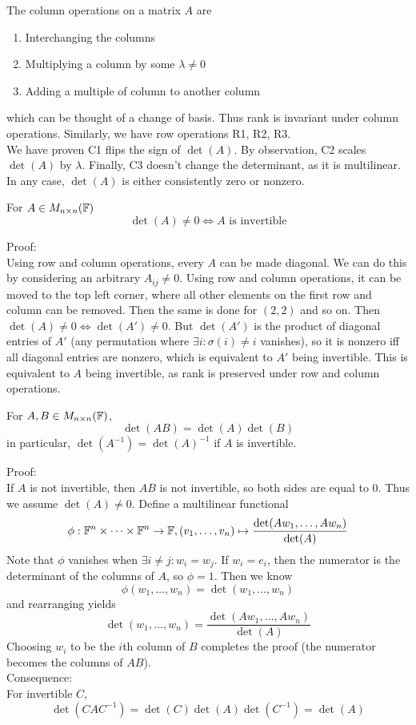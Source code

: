 \documentclass[12pt]{article}
\begin{document}
The column operations on a matrix $A$ are

\begin{enumerate}
	\item Interchanging the columns \\
	\item Multiplying a column by some $\lambda\neq0$ \\
	\item Adding a multiple of column to another column
\end{enumerate}

which can be thought of a change of basis. Thus rank is invariant under column operations. Similarly, we have row operations R1, R2, R3. \\
We have proven C1 flips the sign of $\det(A)$. By observation, C2 scales $\det(A)$ by $\lambda$. Finally, C3 doesn't change the determinant, as it is multilinear. In any case, $\det(A)$ is either consistently zero or nonzero.

\begin{thm}
	For $A\in M_{n\times n}(\mathbb{F})$
	$$\det(A)\neq0 \Leftrightarrow A \text{ is invertible}$$
\end{thm}

Proof: \\
Using row and column operations, every $A$ can be made diagonal. We can do this by considering an arbitrary $A_{ij}\neq0$. Using row and column operations, it can be moved to the top left corner, where all other elements on the first row and column can be removed. Then the same is done for $(2,2)$ and so on. Then $\det(A)\neq0\Leftrightarrow\det(A')\neq0$. But $\det(A')$ is the product of diagonal entries of $A'$ (any permutation where $\exists i:\sigma(i)\neq i$ vanishes), so it is nonzero iff all diagonal entries are nonzero, which is equivalent to $A'$ being invertible. This is equivalent to $A$ being invertible, as rank is preserved under row and column operations.

\begin{thm}
	For $A,B\in M_{n\times n}(\mathbb{F})$,
	$$\det(AB) = \det(A)\det(B)$$
	in particular, $\det(A^{-1}) = \det(A)^{-1}$ if $A$ is invertible.
\end{thm}

Proof: \\
If $A$ is not invertible, then $AB$ is not invertible, so both sides are equal to 0. Thus we assume $\det(A)\neq0$. Define a multilinear functional
$$\phi:\mathbb{F}^n\times\dots\times\mathbb{F}^n\rightarrow\mathbb{F}, (v_1,\dots,v_n) \mapsto \frac{\det(Aw_1,\dots,Aw_n)}{\det(A)}$$
Note that $\phi$ vanishes when $\exists i\neq j:w_i=w_j$. If $w_i=e_i$, then the numerator is the determinant of the columns of $A$, so $\phi=1$. Then we know
$$\phi(w_1,\dots,w_n) = \det(w_1,\dots,w_n)$$
and rearranging yields
$$\det(w_1,\dots,w_n) = \frac{\det(Aw_1,\dots,Aw_n)}{\det(A)}$$
Choosing $w_i$ to be the $i$th column of $B$ completes the proof (the numerator becomes the columns of $AB$). \\
Consequence: \\
For invertible $C$,
$$\det(CAC^{-1}) = \det(C)\det(A)\det(C^{-1}) = \det(A)$$
\end{document}
